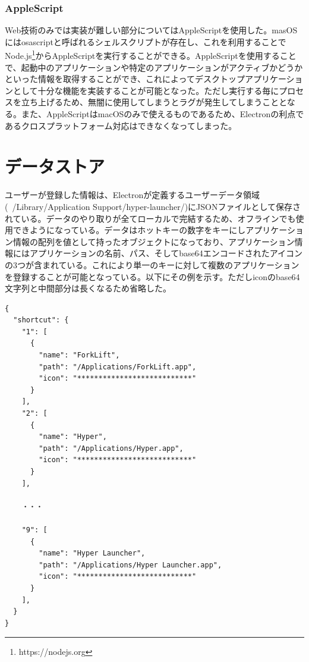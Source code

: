 \subsubsection{AppleScript}
Web技術のみでは実装が難しい部分についてはAppleScriptを使用した。masOSにはosascriptと呼ばれるシェルスクリプトが存在し、これを利用することでNode.js\footnote{https://nodejs.org}からAppleScriptを実行することができる。AppleScriptを使用することで、起動中のアプリケーションや特定のアプリケーションがアクティブかどうかといった情報を取得することができ、これによってデスクトップアプリケーションとして十分な機能を実装することが可能となった。ただし実行する毎にプロセスを立ち上げるため、無闇に使用してしまうとラグが発生してしまうこととなる。また、AppleScriptはmacOSのみで使えるものであるため、Electronの利点であるクロスプラットフォーム対応はできなくなってしまった。

\section{データストア}
ユーザーが登録した情報は、Electronが定義するユーザーデータ領域(~/Library/Application Support/hyper-launcher/)にJSONファイルとして保存されている。データのやり取りが全てローカルで完結するため、オフラインでも使用できようになっている。データはホットキーの数字をキーにしアプリケーション情報の配列を値として持ったオブジェクトになっており、アプリケーション情報にはアプリケーションの名前、パス、そしてbase64エンコードされたアイコンの3つが含まれている。これにより単一のキーに対して複数のアプリケーションを登録することが可能となっている。以下にその例を示す。ただしiconのbase64文字列と中間部分は長くなるため省略した。

\begin{lstlisting}[caption=config.json]
{
  "shortcut": {
    "1": [
      {
        "name": "ForkLift",
        "path": "/Applications/ForkLift.app",
        "icon": "***************************"
      }
    ],
    "2": [
      {
        "name": "Hyper",
        "path": "/Applications/Hyper.app",
        "icon": "***************************"
      }
    ],
    
    ・・・
    
    "9": [
      {
        "name": "Hyper Launcher",
        "path": "/Applications/Hyper Launcher.app",
        "icon": "***************************"
      }
    ],
  }
}
\end{lstlisting}